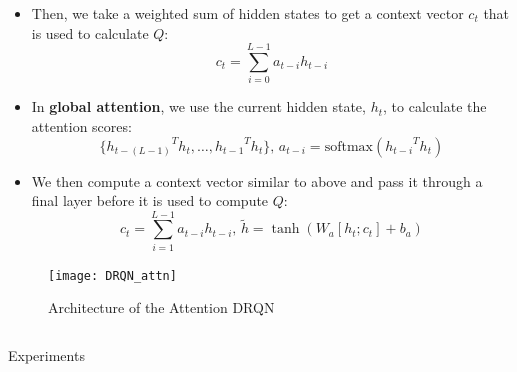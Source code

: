 \documentclass[final]{beamer}
\newlength{\onecolwid}
\newlength{\twocolwid}
\begin{document}
\begin{frame}[t]
\begin{columns}[t]
\begin{column}{\twocolwid}
\begin{columns}[t,totalwidth=\twocolwid]
\begin{column}{\onecolwid}
\begin{itemize}
        \item Then, we take a weighted sum of hidden states to get a context
            vector $c_t$ that is used to calculate $Q$:
            $$c_t = \sum_{i=0}^{L-1}a_{t-i}h_{t-i}$$
        \item In \textbf{global attention}, we use the current hidden state, $h_t$,
            to calculate the attention scores:
            $$\{{h_{t-(L-1)}}^Th_t, \dots, {h_{t-1}}^Th_t\} \text{, }
              a_{t-i} = \text{softmax}({h_{t-i}}^Th_t)$$
        \item We then compute a context vector similar to above and pass it through
            a final layer before it is used to compute $Q$:
            $$c_t = \sum_{i=1}^{L-1}a_{t-i}h_{t-i} \text{, }
              \tilde{h} = \tanh(W_a[h_t;c_t] + b_a)$$
\end{itemize}

\begin{figure}[h]
    \centering
    \texttt{[image: DRQN\_attn]}
    \caption{Architecture of the Attention DRQN}
\end{figure}


\end{column} %

\end{columns} %


\begin{column}{\twocolwid}

\begin{block}{Experiments}
\end{block}

\end{column}

\begin{columns}[t,totalwidth=\twocolwid] %

\begin{column}{\onecolwid} %


\end{column}
\end{columns}
\end{column}
\end{columns}
\end{frame}
\end{document}
